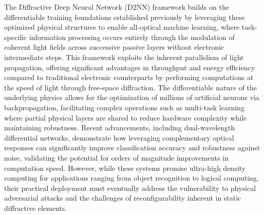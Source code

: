The Diffractive Deep Neural Network (D2NN) framework builds on the differentiable training foundations established previously by leveraging these optimized physical structures to enable all-optical machine learning, where task-specific information processing occurs entirely through the modulation of coherent light fields across successive passive layers without electronic intermediate steps. This framework exploits the inherent parallelism of light propagation, offering significant advantages in throughput and energy efficiency compared to traditional electronic counterparts by performing computations at the speed of light through free-space diffraction. The differentiable nature of the underlying physics allows for the optimization of millions of artificial neurons via backpropagation, facilitating complex operations such as multi-task learning where partial physical layers are shared to reduce hardware complexity while maintaining robustness. Recent advancements, including dual-wavelength differential networks, demonstrate how leveraging complementary optical responses can significantly improve classification accuracy and robustness against noise, validating the potential for orders of magnitude improvements in computation speed. However, while these systems promise ultra-high density computing for applications ranging from object recognition to logical computing, their practical deployment must eventually address the vulnerability to physical adversarial attacks and the challenges of reconfigurability inherent in static diffractive elements. \citep{doi_10_1515_nanoph_2023_0760_2c3ec088} \citep{s2_88f87b34acdb11cf20ad16d6fbdd5399e8617f8f_a548a720} \citep{doi_10_1002_lpor_202500433_c50e8d3b} \citep{doi_10_1109_dac18074_2021_9586204_0c48190f}

